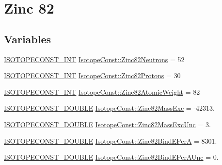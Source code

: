 \hypertarget{group___isotope_const-_zinc-_zn82}{}\section{Zinc 82}
\label{group___isotope_const-_zinc-_zn82}
\subsection*{Variables}
\begin{DoxyCompactItemize}
\item 
\mbox{\hyperlink{group___isotope_const-_macros_ga5f18360b3e99483a35c32d789e62621c}{I\+S\+O\+T\+O\+P\+E\+C\+O\+N\+S\+T\+\_\+\+I\+NT}} \mbox{\hyperlink{group___isotope_const-_zinc-_zn82_ga09a9601314ca512758ded688b3ee9739}{Isotope\+Const\+::\+Zinc82\+Neutrons}} = 52
\item 
\mbox{\hyperlink{group___isotope_const-_macros_ga5f18360b3e99483a35c32d789e62621c}{I\+S\+O\+T\+O\+P\+E\+C\+O\+N\+S\+T\+\_\+\+I\+NT}} \mbox{\hyperlink{group___isotope_const-_zinc-_zn82_gac28e1a125725423344d80d97d423941f}{Isotope\+Const\+::\+Zinc82\+Protons}} = 30
\item 
\mbox{\hyperlink{group___isotope_const-_macros_ga5f18360b3e99483a35c32d789e62621c}{I\+S\+O\+T\+O\+P\+E\+C\+O\+N\+S\+T\+\_\+\+I\+NT}} \mbox{\hyperlink{group___isotope_const-_zinc-_zn82_ga145f2cbcef897ce7a30d3500f5a81e0c}{Isotope\+Const\+::\+Zinc82\+Atomic\+Weight}} = 82
\item 
\mbox{\hyperlink{group___isotope_const-_macros_ga8f45a7272ce02c0b4c65c44636ed719a}{I\+S\+O\+T\+O\+P\+E\+C\+O\+N\+S\+T\+\_\+\+D\+O\+U\+B\+LE}} \mbox{\hyperlink{group___isotope_const-_zinc-_zn82_ga63efa3b919b54d1da184895319b45ee1}{Isotope\+Const\+::\+Zinc82\+Mass\+Exc}} = -\/42313.
\item 
\mbox{\hyperlink{group___isotope_const-_macros_ga8f45a7272ce02c0b4c65c44636ed719a}{I\+S\+O\+T\+O\+P\+E\+C\+O\+N\+S\+T\+\_\+\+D\+O\+U\+B\+LE}} \mbox{\hyperlink{group___isotope_const-_zinc-_zn82_ga17a62c38bc68e38c361665b83f2d63d0}{Isotope\+Const\+::\+Zinc82\+Mass\+Exc\+Unc}} = 3.
\item 
\mbox{\hyperlink{group___isotope_const-_macros_ga8f45a7272ce02c0b4c65c44636ed719a}{I\+S\+O\+T\+O\+P\+E\+C\+O\+N\+S\+T\+\_\+\+D\+O\+U\+B\+LE}} \mbox{\hyperlink{group___isotope_const-_zinc-_zn82_ga60a3300e5eebe80552d359a92a5bce96}{Isotope\+Const\+::\+Zinc82\+Bind\+E\+PerA}} = 8301.
\item 
\mbox{\hyperlink{group___isotope_const-_macros_ga8f45a7272ce02c0b4c65c44636ed719a}{I\+S\+O\+T\+O\+P\+E\+C\+O\+N\+S\+T\+\_\+\+D\+O\+U\+B\+LE}} \mbox{\hyperlink{group___isotope_const-_zinc-_zn82_gae05362ce1658340ee7ccfeb030cebc82}{Isotope\+Const\+::\+Zinc82\+Bind\+E\+Per\+A\+Unc}} = 0.

\end{DoxyCompactItemize}
